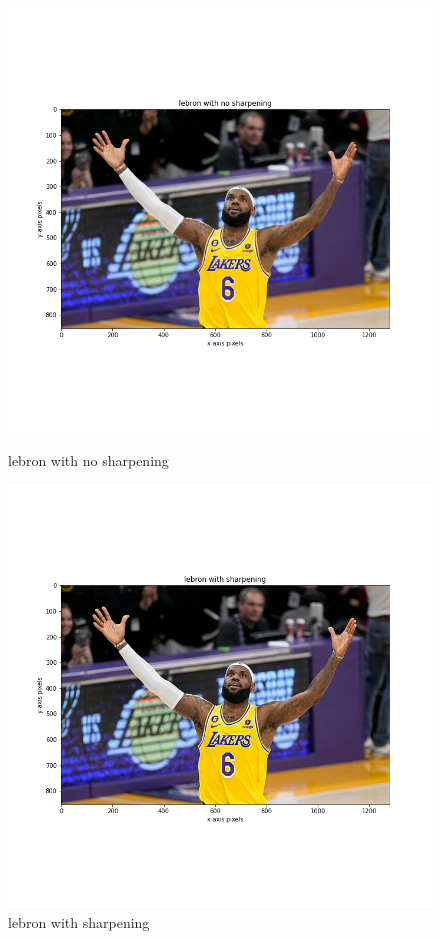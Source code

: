 \documentclass{article}
\begin{document}
\begin{figure}[!htb]
    \includegraphics[width=\linewidth]{lebron with no sharpening.png}
    \caption{lebron with no sharpening}\label{fig:awesome_image1}
\endminipage
{}
    \includegraphics[width=\linewidth]{lebron with sharpening.png}
    \caption{lebron with sharpening}\label{fig:awesome_image2}
\endminipage
\end{figure}
\end{document}

